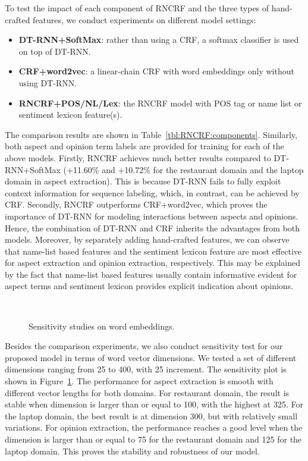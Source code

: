 \documentclass[11pt,letterpaper]{article}
\begin{document}
To test the impact of each component of RNCRF and the three types of hand-crafted features, we conduct experiments on different model settings:
\begin{itemize}
\item \textbf{DT-RNN+SoftMax}: rather than using a CRF, a softmax classifier is used on top of DT-RNN.
\item \textbf{CRF+word2vec}: a linear-chain CRF with word embeddings only without using DT-RNN.
\item \textbf{RNCRF+POS/NL/Lex}: the RNCRF model with POS tag or name list or sentiment lexicon feature(s).
\end{itemize}
The comparison results are shown in Table~\ref{tbl:RNCRF:components}. Similarly, both aspect and opinion term labels are provided for training for each of the above models. Firstly, RNCRF achieves much better results compared to DT-RNN+SoftMax (+11.60\% and +10.72\% for the restaurant domain and the laptop domain in aspect extraction). This is because DT-RNN fails to fully exploit context information for sequence labeling, which, in contrast, can be achieved by CRF. Secondly, RNCRF outperforms CRF+word2vec, which proves the importance of DT-RNN for modeling interactions between aspects and opinions. Hence, the combination of DT-RNN and CRF inherits the advantages from both models. Moreover, by separately adding hand-crafted features, we can observe that name-list based features and the sentiment lexicon feature are most effective for aspect extraction and opinion extraction, respectively. This may be explained by the fact that name-list based features usually contain informative evident for aspect terms and sentiment lexicon provides explicit indication about opinions. 

\begin{figure}[t!]
\centering
	\\
	\caption{Sensitivity studies on word embeddings.}\label{fig:sensitivity_new}
\end{figure}
Besides the comparison experiments, we also conduct sensitivity test for our proposed model in terms of word vector dimensions. We tested a set of different dimensions ranging from 25 to 400, with 25 increment. The sensitivity plot is shown in Figure~\ref{fig:sensitivity_new}. The performance for aspect extraction is smooth with different vector lengths for both domains. For restaurant domain, the result is stable when dimension is larger than or equal to 100, with the highest at 325. For the laptop domain, the best result is at dimension 300, but with relatively small variations. For opinion extraction, the performance reaches a good level when the dimension is larger than or equal to 75 for the restaurant domain and 125 for the laptop domain. This proves the stability and robustness of our model.
\end{document}
